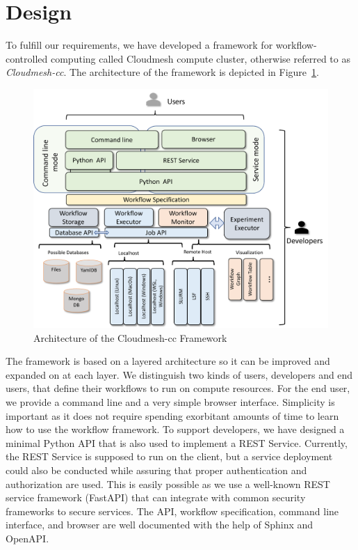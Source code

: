 
\section{Design}

To fulfill our requirements, we have developed a framework for
workflow-controlled computing called Cloudmesh compute cluster,
otherwise referred to as
{\em Cloudmesh-cc}. The architecture of the framework is depicted in
Figure~\ref{fig:arch}.

\begin{figure}[htb]
\centering
\includegraphics[width=1.0\columnwidth]{images/cloudmesh-cc-arch.pdf}
\caption{Architecture of the Cloudmesh-cc Framework}\label{fig:arch}
\end{figure}

The framework is based on a layered architecture so it can be improved
and expanded on at each layer. We distinguish two kinds of users,
developers and end users, that define their workflows to run on
compute resources. For the end user, we provide a command line and a
very simple browser interface. Simplicity is important as it does
not require spending exorbitant amounts of time to learn how to use
the workflow framework. To support developers, we have designed a
minimal Python API that is also used to implement a REST Service.
Currently, the REST Service is supposed to run on the client, but a
service deployment could also be conducted while assuring that proper
authentication and authorization are used. This is easily possible as
we use a well-known REST service framework (FastAPI) that can integrate
with common security frameworks to secure services. The API, workflow
specification, command line interface, and browser are well documented
with the help of Sphinx and OpenAPI.

